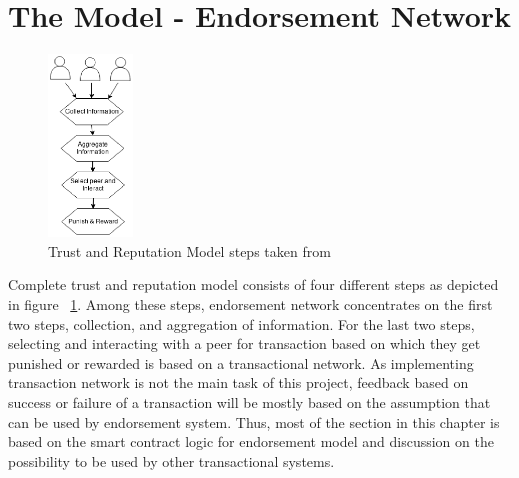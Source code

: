 \section{The Model - Endorsement Network}\label{sec:endorsementModel}
\begin{figure}
	\begin{center}
		\includegraphics[width=0.2\textwidth]{Images/trustRepSteps.eps}
		\caption{Trust and Reputation Model steps taken from \cite{marmol2009security}}
		\label{fig:truststep}
	\end{center}
\end{figure}
Complete trust and reputation model consists of four different steps as
depicted in figure ~\ref{fig:truststep}. Among these steps, endorsement network
concentrates on the first two steps, collection, and aggregation of
information. For the last two steps, selecting and interacting with a peer for
transaction based on which they get punished or rewarded is based on a
transactional network. 
As implementing transaction network is not the main task
of this project, feedback based on success or failure of a transaction will be
mostly based on the assumption that can be used by endorsement system.  Thus,
most of the section in this chapter is based on the smart contract logic for
endorsement model and discussion on the possibility to be used by other
transactional systems. 

